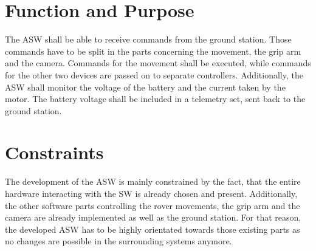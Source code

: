\section{Function and Purpose}
The ASW shall be able to receive commands from the ground station. Those commands have to be split in the parts concerning the movement, the grip arm and the camera. Commands for the movement shall be executed, while commands for the other two devices are passed on to separate controllers. Additionally, the ASW shall monitor the voltage of the battery and the current taken by the motor. The battery voltage shall be included in a telemetry set, sent back to the ground station.\\


\section{Constraints}

The development of the ASW is mainly constrained by the fact, that the entire hardware interacting with the SW is already chosen and present. Additionally, the other software parts controlling the rover movements, the grip arm and the camera are already implemented as well as the ground station. For that reason, the developed ASW has to be highly orientated towards those existing parts as no changes are possible in the surrounding systems anymore.